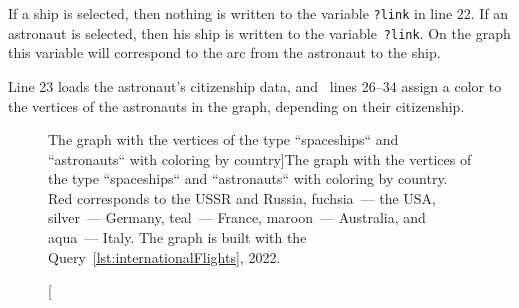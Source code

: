 If a ship is selected, then nothing is written to the variable \lstinline|?link| in line 22. If an astronaut is selected, then his ship is written to the variable~\lstinline|?link|. On the graph this variable will correspond to the arc from the astronaut to the ship. 

Line 23 loads the astronaut's citizenship data, and~ lines 26--34 assign a color to the vertices of the astronauts in the graph, depending on their citizenship. 

\begin{figure}[h]
  \setlength{\fboxsep}{0pt}%
  \setlength{\fboxrule}{1pt}%
  \caption[The graph with the vertices of the type ``spaceships`` and ``astronauts`` with coloring by country]{The graph with the vertices of the type ``spaceships`` and ``astronauts`` with coloring by country. Red corresponds to the USSR and Russia, fuchsia~--- the USA, silver~--- Germany, teal~--- France, maroon~--- Australia, and aqua~--- Italy. The graph is built with the Query~\protect\ref{lst:internationalFlights}, 2022.}
  \label{fig:internationalFlights}%
\end{figure}

